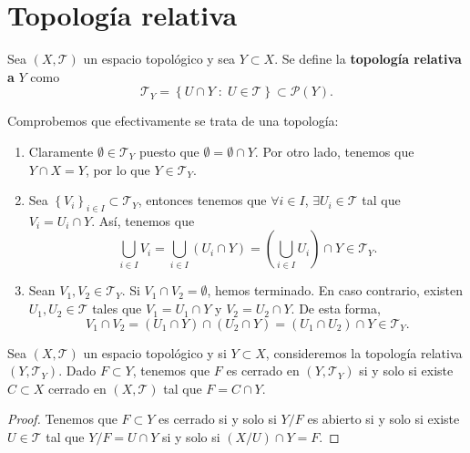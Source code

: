 \section{Topología relativa}
\begin{definition}
Sea $\displaystyle \left(X, \mathcal{T}\right) $ un espacio topológico y sea $\displaystyle Y \subset X $. Se define la \textbf{topología relativa a} $\displaystyle Y $ como 
\[\mathcal{T}_{Y} = \left\{ U \cap Y \; : \; U \in \mathcal{T}\right\} \subset \mathcal{P}\left(Y\right) .\]
\end{definition}
Comprobemos que efectivamente se trata de una topología:
\begin{enumerate}
\item Claramente $\displaystyle \emptyset \in \mathcal{T}_{Y} $ puesto que $\displaystyle \emptyset = \emptyset \cap Y $. Por otro lado, tenemos que $\displaystyle Y \cap X = Y $, por lo que $\displaystyle Y \in \mathcal{T}_{Y} $. 
\item Sea $\displaystyle \left\{ V_{i}\right\} _{i \in I}\subset \mathcal{T}_{Y} $, entonces tenemos que $\displaystyle \forall i \in I $, $\displaystyle \exists U_{i} \in \mathcal{T} $ tal que $\displaystyle V_{i} = U_{i} \cap Y $. Así, tenemos que 
	\[\bigcup_{i \in I}V_{i} = \bigcup_{i \in I}\left(U_{i} \cap Y\right)=\left(\bigcup_{i \in I}U_{i}\right)\cap Y \in \mathcal{T}_{Y} .\]
\item Sean $\displaystyle V_{1}, V_{2} \in \mathcal{T}_{Y} $. Si $\displaystyle V_{1} \cap V_{2} = \emptyset $, hemos terminado. En caso contrario, existen $\displaystyle U_{1}, U_{2} \in \mathcal{T} $ tales que $\displaystyle V_{1} = U_{1} \cap Y $ y $\displaystyle V_{2} = U_{2} \cap Y $. De esta forma, 
	\[V_{1} \cap V_{2}=\left(U_{1} \cap Y\right)\cap \left(U_{2} \cap Y\right)=\left(U_{1}\cap U_{2}\right)\cap Y \in \mathcal{T}_{Y} .\]
\end{enumerate}
\begin{prop}
Sea $\displaystyle \left(X, \mathcal{T}\right) $ un espacio topológico y si $\displaystyle Y \subset X $, consideremos la topología relativa $\displaystyle \left(Y, \mathcal{T}_{Y}\right) $. Dado $\displaystyle F \subset Y $, tenemos que $\displaystyle F $ es cerrado en $\displaystyle \left(Y, \mathcal{T}_{Y}\right) $ si y solo si existe $\displaystyle C \subset X $ cerrado en $\displaystyle \left(X, \mathcal{T}\right) $ tal que $\displaystyle F = C \cap Y $.
\end{prop}
\begin{proof}
Tenemos que $\displaystyle F \subset Y $ es cerrado si y solo si $\displaystyle Y/F $ es abierto si y solo si existe $\displaystyle U \in \mathcal{T} $ tal que $\displaystyle Y/F = U \cap Y $ si y solo si $\displaystyle \left(X/U\right)\cap Y = F $. 
\end{proof}
